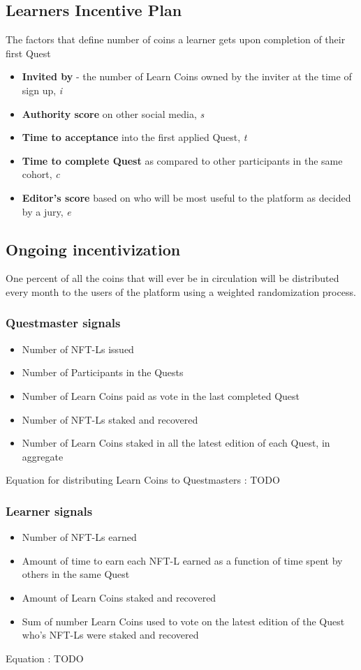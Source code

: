 \documentclass{article}
\begin{document}
    \subsection{Learners Incentive Plan}
      The factors that define number of coins a learner gets upon completion of their first Quest
      \begin{itemize}
        \item \textbf{Invited by } - the number of Learn Coins owned by the inviter at the time of sign up, \textit{i}
        \item \textbf{Authority score} on other social media, \textit{s}
        \item \textbf{Time to acceptance} into the first applied Quest, \textit{t}
        \item \textbf{Time to complete Quest} as compared to other participants in the same cohort, \textit{c}
        \item \textbf{Editor's score} based on who will be most useful to the platform as decided by a jury, \textit{e}
      \end{itemize}
    \subsection{Ongoing incentivization}
      One percent of all the coins that will ever be in circulation will be distributed every month to the users of the platform using a weighted randomization process. 
      \subsubsection{Questmaster signals}
        \begin{itemize}
          \item Number of NFT-Ls issued
          \item Number of Participants in the Quests
          \item Number of Learn Coins paid as vote in the last completed Quest
          \item Number of NFT-Ls staked and recovered
          \item Number of Learn Coins staked in all the latest edition of each Quest, in aggregate
        \end{itemize}
        Equation for distributing Learn Coins to Questmasters : TODO
      \subsubsection{Learner signals}  
        \begin{itemize}
          \item Number of NFT-Ls earned
          \item Amount of time to earn each NFT-L earned as a function of time spent by others in the same Quest
          \item Amount of Learn Coins staked and recovered
          \item Sum of number Learn Coins used to vote on the latest edition of the Quest who's NFT-Ls were staked and recovered
        \end{itemize}
        Equation : TODO
\end{document}
